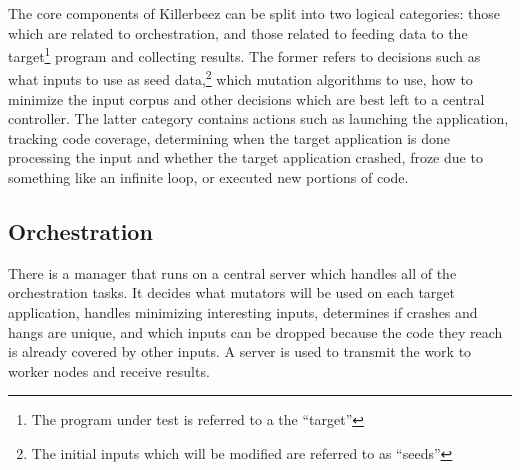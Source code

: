 The core components of Killerbeez can be split into two logical categories:
those which are related to orchestration, and those related to feeding data
to the target\footnote{The program under test is referred to a the ``target''}
program and collecting results.  The former refers to decisions such as what
inputs to use as seed data,\footnote{The initial inputs which will be modified
are referred to as ``seeds''} which mutation algorithms to use, how to minimize
the input corpus and other decisions which are best left to a central
controller.  The latter category contains actions such as launching the
application, tracking code coverage, determining when the target application is
done processing the input and whether the target application crashed, froze due
to something like an infinite loop, or executed new portions of code.

\subsection{Orchestration}
There is a manager that runs on a central server which handles all of the
orchestration tasks.  It decides what mutators will be used on each target
application, handles minimizing interesting inputs, determines if crashes
and hangs are unique, and which inputs can be dropped because the code they
reach is already covered by other inputs. A \BOINC{} server is used to transmit
the work to worker nodes and receive results.

